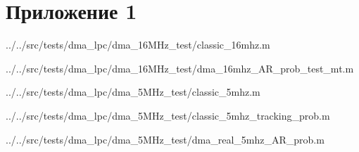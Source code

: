 \appendix

\chapter*{Приложение 1}
\label{app:1}


{../../src/tests/dma_lpc/dma_16MHz_test/classic_16mhz.m}


{../../src/tests/dma_lpc/dma_16MHz_test/dma_16mhz_AR_prob_test_mt.m}



{../../src/tests/dma_lpc/dma_5MHz_test/classic_5mhz.m}


{../../src/tests/dma_lpc/dma_5MHz_test/classic_5mhz_tracking_prob.m}


{../../src/tests/dma_lpc/dma_5MHz_test/dma_real_5mhz_AR_prob.m}

